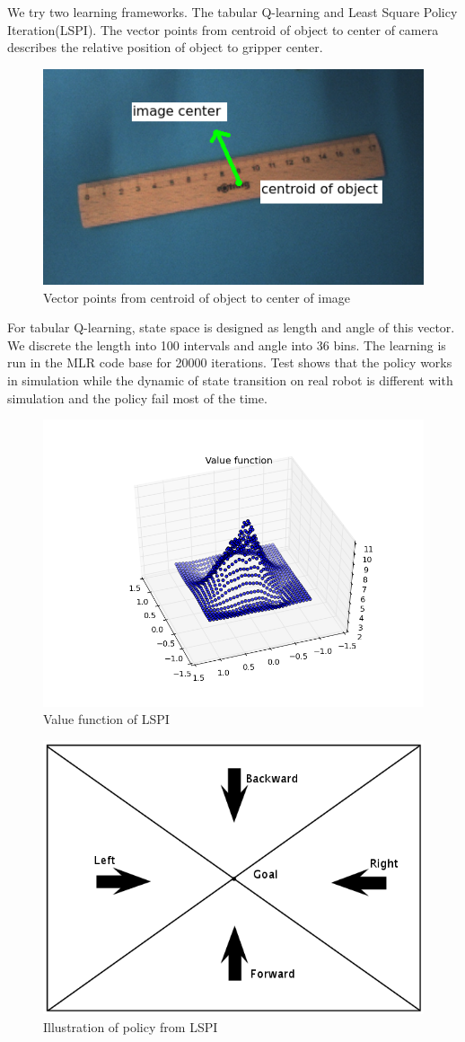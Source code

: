 \documentclass[a4paper, 10pt, conference]{ieeeconf}      %
\begin{document}
We try two learning frameworks. The tabular Q-learning\cite{c2} and Least Square Policy Iteration(LSPI)\cite{c3}. The vector points from centroid of object to center of camera describes the relative position of object to gripper center. 
\begin{figure}[!htb]
	\centering
	\includegraphics[width=0.6\linewidth]{vector}
	\caption{\label{fig:state1}Vector points from centroid of object to center of image}
\end{figure}
For tabular Q-learning, state space is designed as length and angle of this vector.  We discrete the length into 100 intervals and angle into 36 bins. The learning is run in the MLR code base for 20000 iterations. Test shows that the policy works in simulation while the dynamic of state transition on real robot is different with simulation and the policy fail most of the time. 
\begin{figure}[!htb]
	\centering
	\includegraphics[width=0.9\linewidth]{value}
	\caption{\label{fig:value}Value function of LSPI}
\end{figure}
\begin{figure}[!htb]
	\centering
	\includegraphics[width=0.7\linewidth]{policy.png}
	\caption{\label{fig:policy}Illustration of policy from LSPI}
\end{figure}
\end{document}
